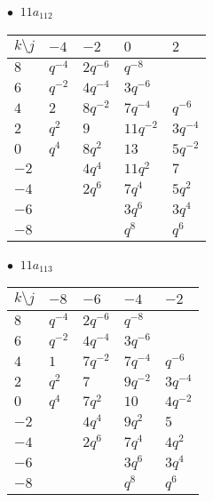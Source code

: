 \begin{minipage}{\linewidth}
$\bullet\ $ $11a_{112}$ \vspace{0.5em} \\
\begin{tabular}{l|llll}
$k \setminus j$ & $-4$ & $-2$ & $0$ & $2$ \\
\hline
$8$ & $q^{-4}$ & $2q^{-6}$ & $q^{-8}$ &  \\
$6$ & $q^{-2}$ & $4q^{-4}$ & $3q^{-6}$ &  \\
$4$ & $2$ & $8q^{-2}$ & $7q^{-4}$ & $q^{-6}$ \\
$2$ & $q^{2}$ & $9$ & $11q^{-2}$ & $3q^{-4}$ \\
$0$ & $q^{4}$ & $8q^{2}$ & $13$ & $5q^{-2}$ \\
$-2$ &  & $4q^{4}$ & $11q^{2}$ & $7$ \\
$-4$ &  & $2q^{6}$ & $7q^{4}$ & $5q^{2}$ \\
$-6$ &  &  & $3q^{6}$ & $3q^{4}$ \\
$-8$ &  &  & $q^{8}$ & $q^{6}$ \\
\end{tabular}
\vspace{2em}
\end{minipage}
%
\begin{minipage}{\linewidth}
$\bullet\ $ $11a_{113}$ \vspace{0.5em} \\
\begin{tabular}{l|llll}
$k \setminus j$ & $-8$ & $-6$ & $-4$ & $-2$ \\
\hline
$8$ & $q^{-4}$ & $2q^{-6}$ & $q^{-8}$ &  \\
$6$ & $q^{-2}$ & $4q^{-4}$ & $3q^{-6}$ &  \\
$4$ & $1$ & $7q^{-2}$ & $7q^{-4}$ & $q^{-6}$ \\
$2$ & $q^{2}$ & $7$ & $9q^{-2}$ & $3q^{-4}$ \\
$0$ & $q^{4}$ & $7q^{2}$ & $10$ & $4q^{-2}$ \\
$-2$ &  & $4q^{4}$ & $9q^{2}$ & $5$ \\
$-4$ &  & $2q^{6}$ & $7q^{4}$ & $4q^{2}$ \\
$-6$ &  &  & $3q^{6}$ & $3q^{4}$ \\
$-8$ &  &  & $q^{8}$ & $q^{6}$ \\
\end{tabular}
\vspace{2em}
\end{minipage}
%
